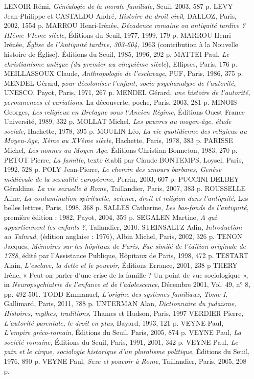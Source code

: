 LENOIR Rémi, \emph{Généalogie de la morale familiale}, Seuil, 2003, 587 p.
LEVY Jean-Philippe et CASTALDO André, \emph{Histoire du droit civil}, DALLOZ, Paris, 2002, 1554 p.
MARROU Henri-Irénée, \emph{Décadence romaine ou antiquité tardive ? IIIème-VIeme siècle}, Éditions du Seuil, 1977, 1999, 179 p.
MARROU Henri-Irénée, \emph{Église de l'Antiquité tardive, 303-604}, 1963 (contribution à la Nouvelle histoire de Église), Éditions du Seuil, 1985, 1996, 292 p.
MATTEI Paul, \emph{Le christianisme antique (du premier au cinquième siècle}), Ellipses, Paris, 176 p.
MEILLASSOUX Claude, \emph{Anthropologie de l'esclavage}, PUF, Paris, 1986, 375 p.
MENDEL Gérard, \emph{pour décoloniser l'enfant, socio psychanalyse de l'autorité}, UNESCO, Payot, Paris, 1971, 267 p.
MENDEL Gérard, \emph{une histoire de l'autorité, permanences et variations}, La découverte, poche, Paris, 2003, 281 p.
MINOIS Georges, \emph{Les religieux en Bretagne sous l'Ancien Régime}, Éditions Ouest France Université, 1989, 332 p.
MOLLAT Michel, \emph{Les pauvres au moyen-âge, étude sociale}, Hachette, 1978, 395 p.
MOULIN Léo, \emph{La vie quotidienne des religieux au Moyen-Age, Xème au XVème siècle}, Hachette, Paris, 1978, 383 p.
PARISSE Michel, \emph{Les nonnes au Moyen-Age}, Éditions Christian Bonneton, 1983, 270 p.
PETOT Pierre, \emph{La famille}, texte établi par Claude BONTEMPS, Loysel, Paris, 1992, 528 p. 
POLY Jean-Pierre, \emph{Le chemin des amours barbares, Genèse} \emph{médiévale de la sexualité européenne}, Perrin, 2003, 607 p. 
PUCCINI-DELBEY Géraldine, \emph{La vie sexuelle à Rome}, Taillandier, Paris, 2007, 383 p.
ROUSSELLE Aline, \emph{La contamination spirituelle, science, droit et religion dans l'antiquité}, Les belles lettres, Paris, 1998, 368 p. 
SALLES Catherine, \emph{Les bas-fonds de l'antiquité}, première édition : 1982, Payot, 2004, 359 p. 
SEGALEN Martine, \emph{A qui appartiennent les enfants ?}, Tallandier, 2010.
STEINSALTZ Adin, \emph{Introduction au Talmud}, (édition anglaise : 1976), Albin Michel, Paris, 2002, 326 p.
TENON Jacques, \emph{Mémoires sur les hôpitaux de Paris, Fac-similé de l'édition originale de 1788}, édité par l'Assistance Publique, Hôpitaux de Paris, 1998, 472 p.
TESTART Alain, \emph{L'esclave, la dette et le pouvoir}, Éditions Errance, 2001, 238 p
THERY Irène, « Peut-on parler d'une crise de la famille ? Un point de vue sociologique », in \emph{Neuropsychiatrie de l'enfance et de l'adolescence}, Décembre 2001, Vol. 49, n° 8, pp. 492-501.
TODD Emmanuel, \emph{L'origine des systèmes familiaux, Tome I}, Gallimard, Paris, 2011, 788 p.
UNTERMAN Alan, \emph{Dictionnaire du judaïsme, Histoires, mythes, traditions}, Thames et Hudson, Paris, 1997
VERDIER Pierre, \emph{L'autorité parentale, le droit en plus}, Bayard, 1993, 121 p. 
VEYNE Paul, \emph{L'empire gréco-romain}, Éditions du Seuil, Paris, 2005, 874 p.
VEYNE Paul, \emph{La société romaine}, Éditions du Seuil, Paris, 1991, 2001, 342 p.
VEYNE Paul, \emph{Le pain et le cirque, sociologie historique d'un pluralisme politique}, Éditions du Seuil, 1976, 890 p.
VEYNE Paul, \emph{Sexe et pouvoir à Rome}, Taillandier, Paris, 2005, 208 p.

